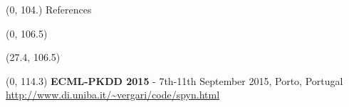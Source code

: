 \documentclass[final]{beamer}
\begin{document}
\begin{frame}{}
  
  
  
  \begin{textblock}{80}(0, 104.)
    References
  \end{textblock}

  
 \begin{textblock}{52}(0, 106.5)
    \small
    \setlength\bibitemsep{8pt}
    \printbibliography[heading=none]
  \end{textblock}
  
  \begin{textblock}{25.2}(27.4, 106.5)
    \small
  \end{textblock}
  

  \begin{textblock}{80}(0, 114.3)
    \footnotesize
    \textbf{ECML-PKDD 2015}  -  7th-11th September 2015, Porto, Portugal\hfill
    {\url{http://www.di.uniba.it/~vergari/code/spyn.html}}
  \end{textblock}
  
\end{frame}
\end{document}
